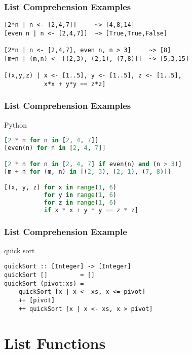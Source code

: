\documentclass[dvipsnames]{beamer}
\theoremstyle{plain}
\begin{document}
\begin{frame}[fragile]
  \frametitle{List Comprehension Examples}

  \begin{exampleblock}{}
    \begin{lstlisting}
[2*n | n <- [2,4,7]]     ~> [4,8,14]
[even n | n <- [2,4,7]]  ~> [True,True,False]

[2*n | n <- [2,4,7], even n, n > 3]     ~> [8]
[m+n | (m,n) <- [(2,3), (2,1), (7,8)]]  ~> [5,3,15]

[(x,y,z) | x <- [1..5], y <- [1..5], z <- [1..5],
           x*x + y*y == z*z]
    \end{lstlisting}
  \end{exampleblock}
\end{frame}

\begin{frame}[fragile]
  \frametitle{List Comprehension Examples}

  \begin{exampleblock}{Python}
    \begin{lstlisting}[language=python]
[2 * n for n in [2, 4, 7]]
[even(n) for n in [2, 4, 7]]

[2 * n for n in [2, 4, 7] if even(n) and (n > 3)]
[m + n for (m, n) in [(2, 3), (2, 1), (7, 8)]]

[(x, y, z) for x in range(1, 6)
           for y in range(1, 6)
           for z in range(1, 6)
           if x * x + y * y == z * z]
    \end{lstlisting}
  \end{exampleblock}
\end{frame}

\begin{frame}[fragile]
  \frametitle{List Comprehension Example}

  \begin{exampleblock}{quick sort}
    \begin{lstlisting}
quickSort :: [Integer] -> [Integer]
quickSort []         = []
quickSort (pivot:xs) =
    quickSort [x | x <- xs, x <= pivot]
    ++ [pivot]
    ++ quickSort [x | x <- xs, x > pivot]
    \end{lstlisting}
  \end{exampleblock}
\end{frame}

\section{List Functions}
\end{document}
